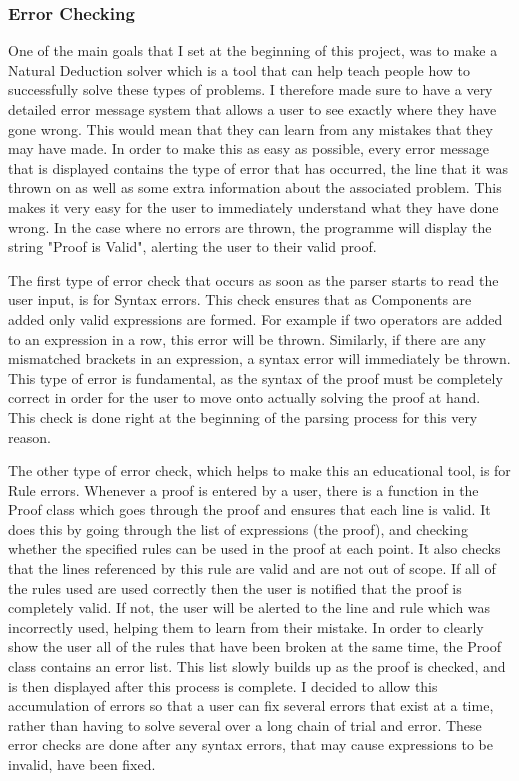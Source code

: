 \subsubsection{Error Checking}

One of the main goals that I set at the beginning of this project, was to make a Natural Deduction solver which is a tool that can help teach people how to successfully solve these types of problems. I therefore made sure to have a very detailed error message system that allows a user to see exactly where they have gone wrong. This would mean that they can learn from any mistakes that they may have made. In order to make this as easy as possible, every error message that is displayed contains the type of error that has occurred, the line that it was thrown on as well as some extra information about the associated problem. This makes it very easy for the user to immediately understand what they have done wrong. In the case where no errors are thrown, the programme will display the string "Proof is Valid", alerting the user to their valid proof. 

The first type of error check that occurs as soon as the parser starts to read the user input, is for Syntax errors. This check ensures that as Components are added only valid expressions are formed.  For example if two operators are added to an expression in a row, this error will be thrown. Similarly, if there are any mismatched brackets in an expression, a syntax error will immediately be thrown. This type of error is fundamental, as the syntax of the proof must be completely correct in order for the user to move onto actually solving the proof at hand. This check is done right at the beginning of the parsing process for this very reason.

The other type of error check, which helps to make this an educational tool, is for Rule errors. Whenever a proof is entered by a user, there is a function in the Proof class which goes through the proof and ensures that each line is valid. It does this by going through the list of expressions (the proof), and checking whether the specified rules can be used in the proof at each point. It also checks that the lines referenced by this rule are valid and are not out of scope. If all of the rules used are used correctly then the user is notified that the proof is completely valid. If not, the user will be alerted to the line and rule which was incorrectly used, helping them to learn from their mistake. In order to clearly show the user all of the rules that have been broken at the same time, the Proof class contains an error list. This list slowly builds up as the proof is checked, and is then displayed after this process is complete. I decided to allow this accumulation of errors so that a user can fix several errors that exist at a time, rather than having to solve several over a long chain of trial and error. These error checks are done after any syntax errors, that may cause expressions to be invalid, have been fixed.

